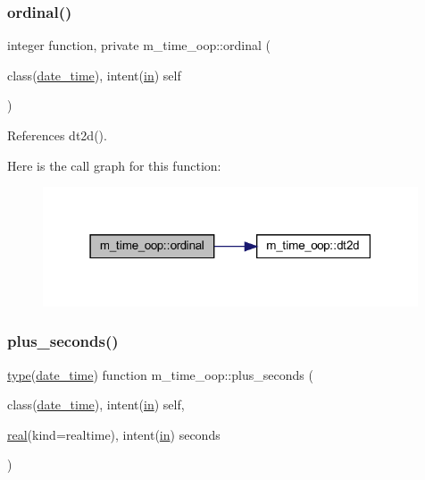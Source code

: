 \subsubsection{\texorpdfstring{ordinal()}{ordinal()}}
{\footnotesize\ttfamily integer function, private m\+\_\+time\+\_\+oop\+::ordinal (\begin{DoxyParamCaption}\item[{class(\hyperlink{structm__time__oop_1_1date__time}{date\+\_\+time}), intent(\hyperlink{M__journal_83_8txt_afce72651d1eed785a2132bee863b2f38}{in})}]{self }\end{DoxyParamCaption})\hspace{0.3cm}{\ttfamily [private]}}



References dt2d().

Here is the call graph for this function\+:
\nopagebreak
\begin{figure}[H]
\begin{center}
\leavevmode
\includegraphics[width=315pt]{namespacem__time__oop_a7845f6da505dff53007df45b5c198081_cgraph}
\end{center}
\end{figure}
\mbox{\label{namespacem__time__oop_a6830c1cce303ec401ac8e4333a5a73d4}} 
\subsubsection{\texorpdfstring{plus\+\_\+seconds()}{plus\_seconds()}}
{\footnotesize\ttfamily \hyperlink{stop__watch_83_8txt_a70f0ead91c32e25323c03265aa302c1c}{type}(\hyperlink{structm__time__oop_1_1date__time}{date\+\_\+time}) function m\+\_\+time\+\_\+oop\+::plus\+\_\+seconds (\begin{DoxyParamCaption}\item[{class(\hyperlink{structm__time__oop_1_1date__time}{date\+\_\+time}), intent(\hyperlink{M__journal_83_8txt_afce72651d1eed785a2132bee863b2f38}{in})}]{self,  }\item[{\hyperlink{read__watch_83_8txt_abdb62bde002f38ef75f810d3a905a823}{real}(kind=realtime), intent(\hyperlink{M__journal_83_8txt_afce72651d1eed785a2132bee863b2f38}{in})}]{seconds }\end{DoxyParamCaption})\hspace{0.3cm}{\ttfamily [private]}}



